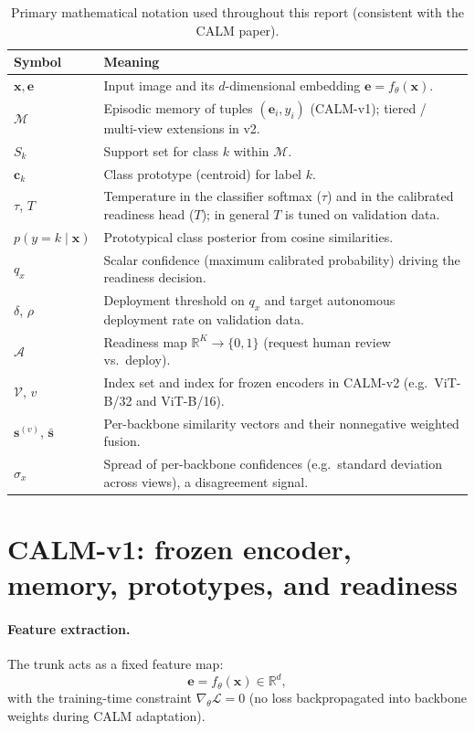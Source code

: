 \documentclass[12pt,a4paper]{report}
\begin{document}
\begin{table}[htbp]
  \centering
  \caption{Primary mathematical notation used throughout this report (consistent with the CALM paper).}
  \label{tab:notation}
  \begin{tabular}{@{}p{2.2cm}p{11.5cm}@{}}
    \toprule
    \textbf{Symbol} & \textbf{Meaning} \\
    \midrule
    $\mathbf{x}, \mathbf{e}$ & Input image and its $d$-dimensional embedding $\mathbf{e} = f_\theta(\mathbf{x})$. \\
    $\mathcal{M}$ & Episodic memory of tuples $(\mathbf{e}_i, y_i)$ (CALM-v1); tiered / multi-view extensions in v2. \\
    $S_k$ & Support set for class $k$ within $\mathcal{M}$. \\
    $\mathbf{c}_k$ & Class prototype (centroid) for label $k$. \\
    $\tau$, $T$ & Temperature in the classifier softmax ($\tau$) and in the calibrated readiness head ($T$); in general $T$ is tuned on validation data. \\
    $p(y{=}k\mid\mathbf{x})$ & Prototypical class posterior from cosine similarities. \\
    $q_x$ & Scalar confidence (maximum calibrated probability) driving the readiness decision. \\
    $\delta$, $\rho$ & Deployment threshold on $q_x$ and target autonomous deployment rate on validation data. \\
    $\mathcal{A}$ & Readiness map $\mathbb{R}^K \to \{0,1\}$ (request human review vs.\ deploy). \\
    $\mathcal{V}$, $v$ & Index set and index for frozen encoders in CALM-v2 (e.g.\ ViT-B/32 and ViT-B/16). \\
    $\mathbf{s}^{(v)}$, $\bar{\mathbf{s}}$ & Per-backbone similarity vectors and their nonnegative weighted fusion. \\
    $\sigma_x$ & Spread of per-backbone confidences (e.g.\ standard deviation across views), a disagreement signal. \\
    \bottomrule
  \end{tabular}
\end{table}

\section{CALM-v1: frozen encoder, memory, prototypes, and readiness}
\paragraph{Feature extraction.}
The trunk acts as a fixed feature map:
\begin{equation}
  \mathbf{e} = f_\theta(\mathbf{x}) \in \mathbb{R}^d,
\end{equation}
with the training-time constraint $\nabla_\theta \mathcal{L} = 0$ (no loss backpropagated into backbone weights during CALM adaptation).
\end{document}
